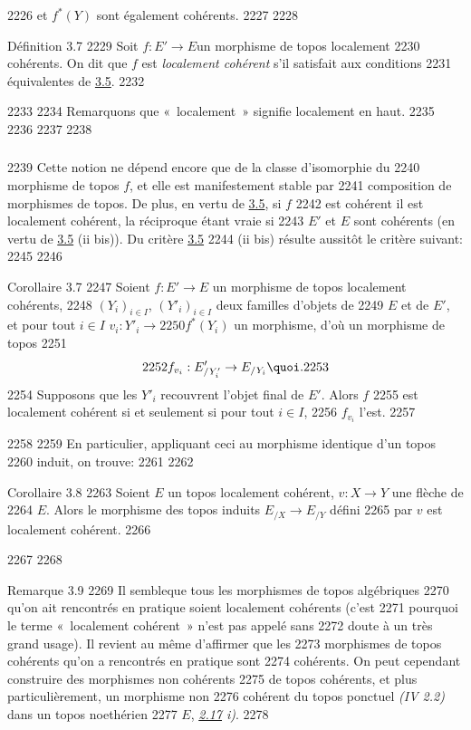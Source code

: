   2226	et $f^{\ast}(Y)$ sont également cohérents.
  2227	
  2228	\begin{enonce*}{Définition 3.7}
  2229	Soit $f : E'\to E$\pageoriginale un morphisme de topos localement
  2230	cohérents. On dit que $f$ est \emph{localement cohérent} s'il satisfait aux conditions
  2231	équivalentes de \hyperref[VI.prop3.5]{3.5}.
  2232	\end{enonce*}
  2233	
  2234	Remarquons que « localement » signifie localement en haut.
  2235	
  2236	\setcounter{subsection}{7}
  2237	\setcounter{subsubsection}{0}
  2238	\subsubsection{}
  2239	Cette notion ne dépend encore que de la classe d'isomorphie du
  2240	morphisme de topos $f$, et elle est manifestement stable par
  2241	composition de morphismes de topos. De plus, en vertu de \hyperref[VI.prop3.5]{3.5}, si $f$
  2242	est cohérent il est localement cohérent, la réciproque étant vraie si
  2243	$E'$ et $E$ sont cohérents (en vertu de \hyperref[VI.prop3.5]{3.5} (ii bis)). Du critère \hyperref[VI.prop3.5]{3.5}
  2244	(ii bis) résulte aussitôt le critère suivant:
  2245	
  2246	\begin{enonce*}{Corollaire 3.7}
  2247	Soient $f : E'\to E$ un morphisme de topos localement cohérents,
  2248	$(Y_i)_{i \in I}$, $({Y'}_i)_{i \in I}$ deux familles d'objets de
  2249	$E$ et de $E'$, et pour tout $i \in I$ $v_i : Y'_i \to
  2250	f^{\ast}(Y_i)$ un morphisme, d'où un morphisme de topos
  2251	$$
  2252	f_{v_i} : E'_{/ Y'_i} \to E_{/Y_i}{\quoi}.
  2253	$$
  2254	Supposons que les ${Y'}_i$ recouvrent l'objet final de $E'$. Alors $f$
  2255	est localement cohérent si et seulement si pour tout $i \in I$,
  2256	$f_{v_i}$ l'est.
  2257	\end{enonce*}
  2258	
  2259	En particulier, appliquant ceci au morphisme identique d'un topos
  2260	induit, on trouve:
  2261	
  2262	\begin{enonce*}{Corollaire 3.8}
  2263	Soient $E$ un topos localement cohérent, $v : X \to Y$ une flèche de
  2264	$E$. Alors le morphisme des topos induits $E_{/X} \to E_{/Y}$ défini
  2265	par $v$ est localement cohérent.
  2266	\end{enonce*}
  2267	
  2268	\begin{enonce*}{Remarque 3.9}
  2269	Il semble\pageoriginale que tous les morphismes de topos algébriques
  2270	qu'on ait rencontrés en pratique soient localement cohérents (c'est
  2271	pourquoi le terme « localement cohérent » n'est pas appelé sans
  2272	doute à un très grand usage). Il revient au même d'affirmer que les
  2273	morphismes de topos cohérents qu'on a rencontrés en pratique sont
  2274	cohérents. On peut cependant construire des morphismes non cohérents
  2275	de topos cohérents, et plus particulièrement, un morphisme non
  2276	cohérent du topos ponctuel \emph{(IV 2.2)} dans un topos noethérien
  2277	$E$, \emph{\cf \hyperref[VI.exer2.17]{2.17} i)}.
  2278	\end{enonce*}
